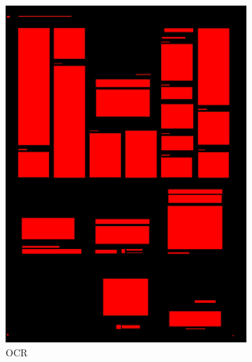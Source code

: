 \documentclass[aspectratio=1610]{beamer}
\begin{document}
\begin{frame}
  \begin{figure}
\centering
\begin{subfigure}{.25\textwidth}
  \centering
  \includegraphics[width=0.99\linewidth, clip=true, trim = 0mm 0mm 0mm 0mm]{figures/ocr/kvtooQ3.jpg}
  \caption{OCR}
\end{subfigure}%
\begin{subfigure}{.25\textwidth}
  \centering

\end{subfigure}
\end{figure}
\end{frame}
\end{document}
